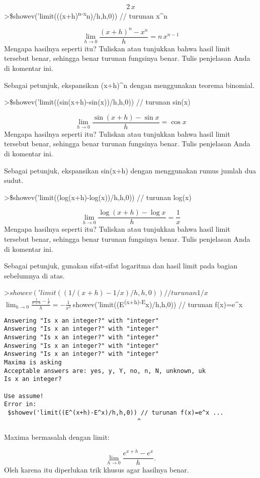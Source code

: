 \documentclass[
]{book}
\begin{document}
\[2\,x\]\textgreater\$showev('limit(((x+h)\textsuperscript{n-x}n)/h,h,0)) // turunan x\^{}n

\[\lim_{h\rightarrow 0}{\frac{\left(x+h\right)^{n}-x^{n}}{h}}=n\,x^{n  -1}\]Mengapa hasilnya seperti itu? Tuliskan atau tunjukkan bahwa hasil limit tersebut benar, sehingga benar turunan fungsinya benar. Tulis penjelasan Anda di komentar ini.

Sebagai petunjuk, ekspansikan (x+h)\^{}n dengan menggunakan teorema binomial.

\textgreater\$showev('limit((sin(x+h)-sin(x))/h,h,0)) // turunan sin(x)

\[\lim_{h\rightarrow 0}{\frac{\sin \left(x+h\right)-\sin x}{h}}=\cos   x\]Mengapa hasilnya seperti itu? Tuliskan atau tunjukkan bahwa hasil limit tersebut benar, sehingga benar turunan fungsinya benar. Tulis penjelasan Anda di komentar ini.

Sebagai petunjuk, ekspansikan sin(x+h) dengan menggunakan rumus jumlah dua sudut.

\textgreater\$showev('limit((log(x+h)-log(x))/h,h,0)) // turunan log(x)

\[\lim_{h\rightarrow 0}{\frac{\log \left(x+h\right)-\log x}{h}}=  \frac{1}{x}\]Mengapa hasilnya seperti itu? Tuliskan atau tunjukkan bahwa hasil limit tersebut benar, sehingga benar turunan fungsinya benar. Tulis penjelasan Anda di komentar ini.

Sebagai petunjuk, gunakan sifat-sifat logaritma dan hasil limit pada bagian sebelumnya di atas.

\textgreater{}\(showev('limit((1/(x+h)-1/x)/h,h,0)) // turunan 1/x\)\(\lim_{h\rightarrow 0}{\frac{\frac{1}{x+h}-\frac{1}{x}}{h}}=-\frac{1  }{x^2}\)\(\>\)showev('limit((E\textsuperscript{(x+h)-E}x)/h,h,0)) // turunan f(x)=e\^{}x

\begin{verbatim}
Answering "Is x an integer?" with "integer"
Answering "Is x an integer?" with "integer"
Answering "Is x an integer?" with "integer"
Answering "Is x an integer?" with "integer"
Answering "Is x an integer?" with "integer"
Maxima is asking
Acceptable answers are: yes, y, Y, no, n, N, unknown, uk
Is x an integer?

Use assume!
Error in:
 $showev('limit((E^(x+h)-E^x)/h,h,0)) // turunan f(x)=e^x ...
                                     ^
\end{verbatim}

Maxima bermasalah dengan limit:

\[\lim_{h\to 0}\frac{e^{x+h}-e^x}{h}.\]Oleh karena itu diperlukan trik khusus agar hasilnya benar.
\end{document}
